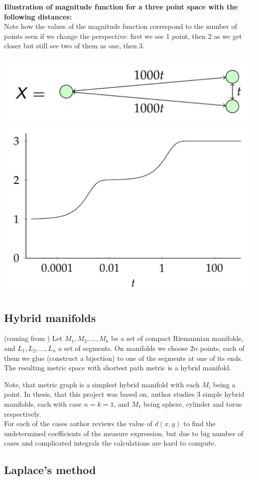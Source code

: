 \documentclass{article}
\begin{document}
\textbf{Illustration of magnitude function for a three point space with the following distances:}
\\ Note how the values of the magnitude function correspond to the number of points seen if we change the perspective: first we see 1 point, then 2 as we get closer but still see two of them as one, then 3.
\begin{center}
\includegraphics[width=.4\textwidth]{3dots} \\ 
\includegraphics[width=.35\textwidth]{mfunc3dots}
\end{center}

\subsection{Hybrid manifolds}

    
\begin{definition} (coming from \textcite{Pankrashkin_2011})
Let $M_1, M_2, ..., M_k$ be a set of compact Riemannian manifolds, and $L_1, L_2, ..., L_n$ a set of segments. 
    On manifolds we choose $2n$ points, each of them we glue (construct a bijection)
    to one of the segments at one of its ends. The resulting metric space with shortest path metric is a hybrid manifold. 
\end{definition}

Note, that metric graph is a simplest hybrid manifold with each $M_i$ being a point. 
In thesis, that this project was based on, author studies 3 simple hybrid manifolds, 
each with case $n = k = 1$, and $M_1$ being sphere, cylinder and torus respectively. 
\\

For each of the cases author reviews the value of $d(x, y)$ to find the undetermined
coefficients of the measure expression, but due to big number of cases and complicated 
integrals the calculations are hard to compute.
\subsection{Laplace's method}
\end{document}

